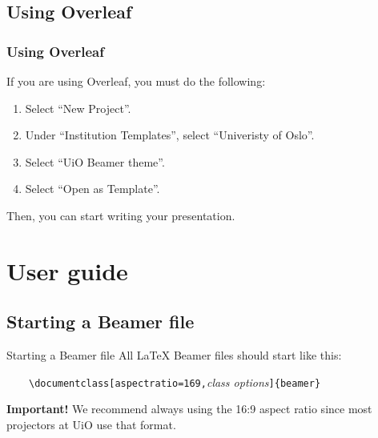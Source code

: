 \documentclass[UKenglish,aspectratio=169]{beamer}
\newcommand{\p}[1]{\texttt{#1}}
\newcommand{\pcmd}[1]{\p{\textbackslash #1}}
\newcommand{\ppar}[1]{\p{\{#1\}}}
\begin{document}
\subsection{Using Overleaf}

\begin{frame}
  \frametitle{Using Overleaf}

  If you are using Overleaf, you must do the
  following:

\begin{enumerate}
\item Select ``New Project''.

\item Under ``Institution Templates'', select ``Univeristy of Oslo''.

\item Select ``UiO Beamer theme''.

\item Select ``Open as Template''.
\end{enumerate}
Then, you can start writing your presentation.
\end{frame}

\section{User guide}
\subsection{Starting a Beamer file}

\begin{frame}{Starting a Beamer file}
  All \LaTeX{} Beamer files should start like this:

  \medskip
  ~~~~\pcmd{documentclass}\p{[aspectratio=169,}\textit{class
        options}\p{]}\ppar{beamer}

  \bigskip
  \begin{alert}{\textbf{Important!} }
    We recommend always using the 16:9 aspect ratio since most
    projectors at UiO use that format.
  \end{alert}
\end{frame}
\end{document}
